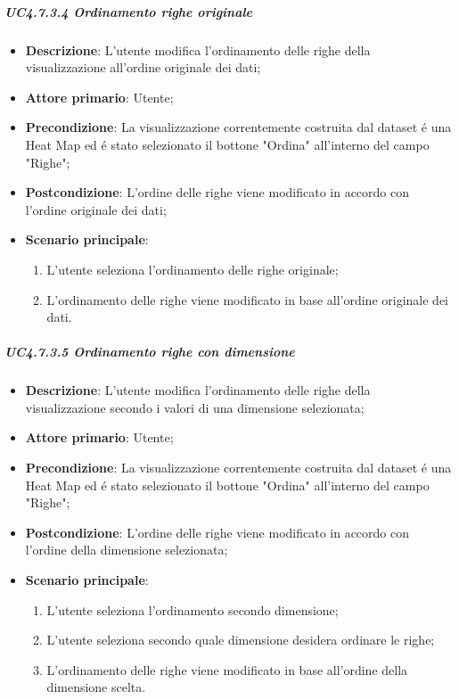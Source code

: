 \subparagraph{UC4.7.3.4 Ordinamento righe originale}
\label{spar:uc4.7.3.4}
\begin{itemize}
    \item \textbf{Descrizione}:     L'utente modifica l'ordinamento delle righe della visualizzazione all'ordine originale dei dati;
    \item \textbf{Attore primario}: Utente;
    \item \textbf{Precondizione}:   La visualizzazione correntemente costruita dal dataset é una Heat Map ed é stato selezionato il bottone "Ordina" all'interno del campo "Righe";
    \item \textbf{Postcondizione}:  L'ordine delle righe viene modificato in accordo con l'ordine originale dei dati;
    \item \textbf{Scenario principale}:
    \begin{enumerate}
        \item L'utente seleziona l'ordinamento delle righe originale;
        \item L'ordinamento delle righe viene modificato in base all'ordine originale dei dati.
    \end{enumerate}
\end{itemize}

\subparagraph{UC4.7.3.5 Ordinamento righe con dimensione}
\label{spar:uc4.7.3.5}
\begin{itemize}
    \item \textbf{Descrizione}:     L'utente modifica l'ordinamento delle righe della visualizzazione secondo i valori di una dimensione selezionata;
    \item \textbf{Attore primario}: Utente;
    \item \textbf{Precondizione}:   La visualizzazione correntemente costruita dal dataset é una Heat Map ed é stato selezionato il bottone "Ordina" all'interno del campo "Righe";
    \item \textbf{Postcondizione}:  L'ordine delle righe viene modificato in accordo con l'ordine della dimensione selezionata;
    \item \textbf{Scenario principale}:
    \begin{enumerate}
        \item L'utente seleziona l'ordinamento secondo dimensione;
        \item L'utente seleziona secondo quale dimensione desidera ordinare le righe;
        \item L'ordinamento delle righe viene modificato in base all'ordine della dimensione scelta.
    \end{enumerate}
\end{itemize}

